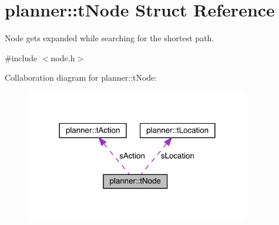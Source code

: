 \hypertarget{structplanner_1_1t_node}{}\section{planner\+:\+:t\+Node Struct Reference}
\label{structplanner_1_1t_node}


Node gets expanded while searching for the shortest path.  




{\ttfamily \#include $<$node.\+h$>$}



Collaboration diagram for planner\+:\+:t\+Node\+:
\nopagebreak
\begin{figure}[H]
\begin{center}
\leavevmode
\includegraphics[width=278pt]{structplanner_1_1t_node__coll__graph}
\end{center}
\end{figure}
